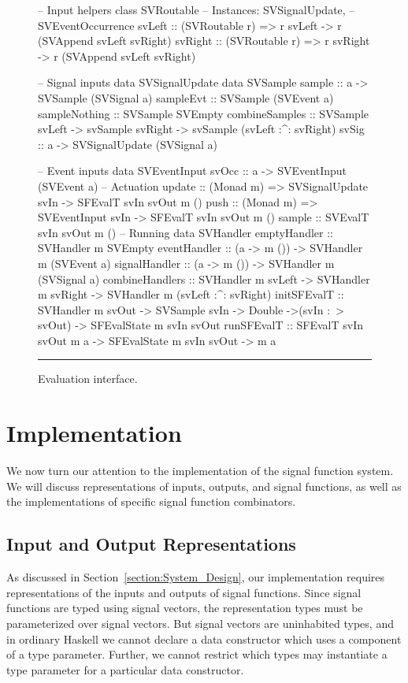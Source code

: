 \documentclass[draft]{llncs}
\begin{document}
\begin{figure}
\begin{code}
-- Input helpers
class SVRoutable -- Instances: SVSignalUpdate,
                 -- SVEventOccurrence
svLeft :: (SVRoutable r) => 
          r svLeft -> r (SVAppend svLeft svRight)
svRight :: (SVRoutable r) =>
           r svRight -> r (SVAppend svLeft svRight)

-- Signal inputs
data SVSignalUpdate
data SVSample
sample :: a -> SVSample (SVSignal a)
sampleEvt :: SVSample (SVEvent a)
sampleNothing :: SVSample SVEmpty
combineSamples :: SVSample svLeft -> svSample svRight 
                  -> svSample (svLeft :^: svRight)
svSig :: a -> SVSignalUpdate (SVSignal a)

-- Event inputs
data SVEventInput
svOcc :: a -> SVEventInput (SVEvent a)
-- Actuation
update :: (Monad m) => SVSignalUpdate svIn 
           -> SFEvalT svIn svOut m ()
push   :: (Monad m) => SVEventInput svIn
          -> SFEvalT svIn svOut m ()
sample :: SVEvalT svIn svOut m ()
-- Running
data SVHandler
emptyHandler :: SVHandler m SVEmpty
eventHandler :: (a -> m ()) 
                -> SVHandler m (SVEvent a)
signalHandler :: (a -> m ()) 
                 -> SVHandler m (SVSignal a)
combineHandlers :: SVHandler m svLeft
                   -> SVHandler m svRight
                   -> SVHandler m (svLeft :^: svRight)
initSFEvalT :: SVHandler m svOut -> SVSample svIn 
               -> Double ->(svIn :~> svOut)
               -> SFEvalState m svIn svOut
runSFEvalT :: SFEvalT svIn svOut m a
              -> SFEvalState m svIn svOut
              -> m a
\end{code}
\hrule
\caption{Evaluation interface.}
\label{figure:evaluation_interface}
\end{figure}

\section{Implementation}
\label{section:Implementation}

We now turn our attention to the implementation of the signal function
system. We will discuss representations of inputs, outputs, and signal functions,
as well as the implementations of specific signal function combinators.

\subsection{Input and Output Representations}
\label{subsection:Input_and_Output_Representations}
As discussed in Section~\ref{section:System_Design}, our implementation requires
representations of the inputs and outputs of signal functions. Since signal
functions are typed using signal vectors, the representation types must be
parameterized over signal vectors. But signal vectors are uninhabited types, and
in ordinary Haskell we cannot declare a data constructor which uses a component
of a type parameter. Further, we cannot restrict which types may instantiate a
type parameter for a particular data constructor.
\end{document}

